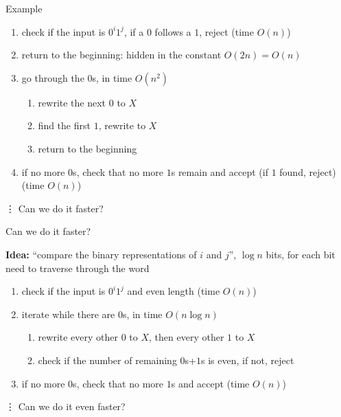 \documentclass[handout]{beamer}
\begin{document}
\begin{frame}{Example}

    \begin{example}[$L=\{0^i1^i \mid i\geq 0\}$ is in $\mathrm{TIME}(n^2)$]
        \begin{enumerate}
            \item check if the input is $0^i1^j$, if a $0$ follows a $1$, reject (time $O(n)$)
            \item return to the beginning: hidden in the constant $O(2n)=O(n)$
            \item go through the $0$s, in time $O(n^2)$
            \begin{enumerate}
                \item rewrite the next $0$ to $X$
                \item find the first $1$, rewrite to $X$
                \item return to the beginning
            \end{enumerate}
            \item if no more $0$s, check that no more $1$s remain and accept (if $1$ found, reject)  (time $O(n)$)\vspace{-6pt}
        \end{enumerate}
    \end{example}
    
    \vdots
    Can we do it faster?

\end{frame}


\begin{frame}{Can we do it faster?}

    \textbf{Idea:} ``compare the binary representations of $i$ and $j$'', $\log n$ bits, for each bit need to traverse through the word


    \begin{example}[$L=\{0^i1^i \mid  i\geq 0\}$ is also in $\mathrm{TIME}(n\log n)$]
        \begin{enumerate}
            \item check if the input is $0^i1^j$ \alert{and even length} (time $O(n)$)          
            \item iterate while there are $0$s, in time $O(n\log n)$
            \begin{enumerate}
                \item rewrite every other $0$ to $X$, then every other $1$ to $X$
                \item check if the number of remaining $0$s+$1$s is even, if not, reject                
            \end{enumerate}
            \item if no more $0$s, check that no more $1$s and accept (time $O(n)$)
            \end{enumerate}    
    \end{example}

    \vdots
    Can we do it even faster?

\end{frame}
\end{document}
